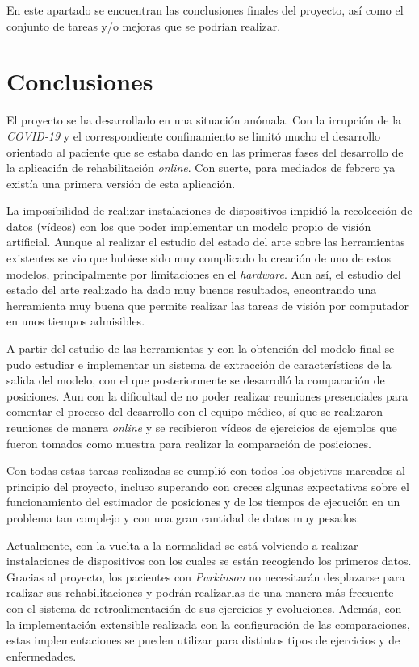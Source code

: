 
En este apartado se encuentran las conclusiones finales del proyecto, así como el conjunto de tareas y/o mejoras que se podrían realizar.

\section{Conclusiones}
El proyecto se ha desarrollado en una situación anómala. Con la irrupción de la \textit{COVID-19} y el correspondiente confinamiento se limitó mucho el desarrollo orientado al paciente que se estaba dando en las primeras fases del desarrollo de la aplicación de rehabilitación \textit{online}. Con suerte, para mediados de febrero ya existía una primera versión de esta aplicación.

La imposibilidad de realizar instalaciones de dispositivos impidió la recolección de datos (vídeos) con los que poder implementar un modelo propio de visión artificial. Aunque al realizar el estudio del estado del arte sobre las herramientas existentes se vio que hubiese sido muy complicado la creación de uno de estos modelos, principalmente por limitaciones en el \textit{hardware}. Aun así, el estudio del estado del arte realizado ha dado muy buenos resultados, encontrando una herramienta muy buena que permite realizar las tareas de visión por computador en unos tiempos admisibles.

A partir del estudio de las herramientas y con la obtención del modelo final se pudo estudiar e implementar un sistema de extracción de características de la salida del modelo, con el que posteriormente se desarrolló la comparación de posiciones. Aun con la dificultad de no poder realizar reuniones presenciales para comentar el proceso del desarrollo con el equipo médico, sí que se realizaron reuniones de manera \textit{online} y se recibieron vídeos de ejercicios de ejemplos que fueron tomados como muestra para realizar la comparación de posiciones. 

Con todas estas tareas realizadas se cumplió con todos los objetivos marcados al principio del proyecto, incluso superando con creces algunas expectativas sobre el funcionamiento del estimador de posiciones y de los tiempos de ejecución en un problema tan complejo y con una gran cantidad de datos muy pesados.

Actualmente, con la vuelta a la normalidad se está volviendo a realizar instalaciones de dispositivos con los cuales se están recogiendo los primeros datos. Gracias al proyecto, los pacientes con \textit{Parkinson} no necesitarán desplazarse para realizar sus rehabilitaciones y podrán realizarlas de una manera más frecuente con el sistema de retroalimentación de sus ejercicios y evoluciones. Además, con la implementación extensible realizada con la configuración de las comparaciones, estas implementaciones se pueden utilizar para distintos tipos de ejercicios y de enfermedades. 

